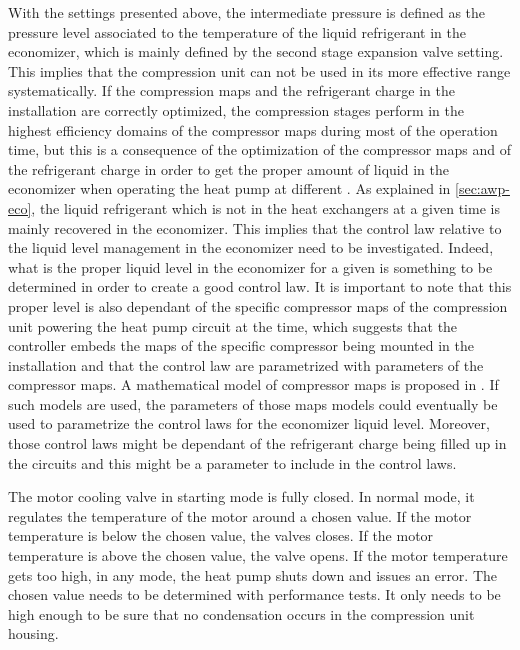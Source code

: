 With the settings presented above, the intermediate pressure is
defined as the pressure level associated to the temperature of the
liquid refrigerant in the economizer, which is mainly defined by the
second stage expansion valve setting. This implies that the
compression unit can not be used in its more effective range
systematically. If the compression maps and the refrigerant charge in
the installation are correctly optimized, the compression stages
perform in the highest efficiency domains of the compressor maps
during most of the operation time, but this is a consequence of the
optimization of the compressor maps and of the refrigerant charge in
order to get the proper amount of liquid in the economizer when
operating the heat pump at different \OP{}. As explained in
\cref{sec:awp-eco}, the liquid refrigerant which is not in the heat
exchangers at a given time is mainly recovered in the economizer. This
implies that the control law relative to the liquid level management
in the economizer need to be investigated. Indeed, what is the proper
liquid level in the economizer for a given \OP{} is something to be
determined in order to create a good control law. It is important to
note that this proper level is also dependant of the specific
compressor maps of the compression unit powering the heat pump circuit
at the time, which suggests that the controller embeds the maps of the
specific compressor being mounted in the installation and that the
control law are parametrized with parameters of the compressor maps. A
mathematical model of compressor maps is proposed in
. If such models are used, the parameters
of those maps models could eventually be used to parametrize the
control laws for the economizer liquid level. Moreover, those control
laws might be dependant of the refrigerant charge being filled up in
the circuits and this might be a parameter to include in the control
laws.

The motor cooling valve in starting mode is fully
closed. In normal mode, it regulates the temperature of
the motor around a chosen value. If the motor temperature is below
the chosen value, the valves closes. If the motor temperature is above
the chosen value, the valve opens. If the motor temperature gets too
high, in any mode, the heat pump shuts down and issues
an error. The chosen value needs to be determined with performance
tests. It only needs to be high enough to be sure that no condensation
occurs in the compression unit housing.

